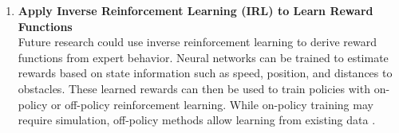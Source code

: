 \begin{enumerate}
  \item \textbf{Apply Inverse Reinforcement Learning (IRL) to Learn Reward Functions} \\
    Future research could use inverse reinforcement learning to derive reward functions from expert behavior. Neural networks can be trained to estimate rewards based on state information such as speed, position, and distances to obstacles. These learned rewards can then be used to train policies with on-policy or off-policy reinforcement learning. While on-policy training may require simulation, off-policy methods allow learning from existing data \autocite{arnob2020off}.

\end{enumerate}
